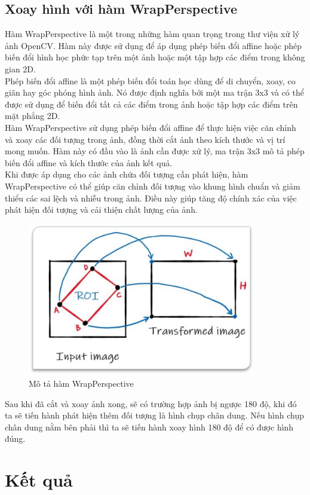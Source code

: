 \documentclass [10pt, fancyhdr, twoside] {article}
\begin{document}
\subsection{Xoay hình với hàm WrapPerspective}
 Hàm WrapPerspective là một trong những hàm quan trọng trong thư viện xử lý ảnh OpenCV. Hàm này được sử dụng để áp dụng phép biến đổi affine hoặc phép biến đổi hình học phức tạp trên một ảnh hoặc một tập hợp các điểm trong không gian 2D.
\\
 Phép biến đổi affine là một phép biến đổi toán học dùng để di chuyển, xoay, co giãn hay góc phóng hình ảnh. Nó được định nghĩa bởi một ma trận 3x3 và có thể được sử dụng để biến đổi tất cả các điểm trong ảnh hoặc tập hợp các điểm trên mặt phẳng 2D.
\\
 Hàm WrapPerspective sử dụng phép biến đổi affine để thực hiện việc căn chỉnh và xoay các đối tượng trong ảnh, đồng thời cắt ảnh theo kích thước và vị trí mong muốn. Hàm này có đầu vào là ảnh cần được xử lý, ma trận 3x3 mô tả phép biến đổi affine và kích thước của ảnh kết quả.
\\
Khi được áp dụng cho các ảnh chứa đối tượng cần phát hiện, hàm WrapPerspective có thể giúp căn chỉnh đối tượng vào khung hình chuẩn và giảm thiểu các sai lệch và nhiễu trong ảnh. Điều này giúp tăng độ chính xác của việc phát hiện đối tượng và cải thiện chất lượng của ảnh.
\begin{figure}[h]
    \caption{Mô tả hàm WrapPerspective}
    \centering
    \includegraphics[width=10cm]{Picture5.jpg}
\end{figure}


Sau khi đã cắt và xoay ảnh xong, sẽ có trường hợp ảnh bị ngược 180 độ, khi đó ta sẽ tiến hành phát hiện thêm đối tượng là hình chụp chân dung. Nếu hình chụp chân dung nằm bên phải thì ta sẽ tiến hành xoay hình 180 độ để có được hình đúng. 
\section{Kết quả}
\end{document}
